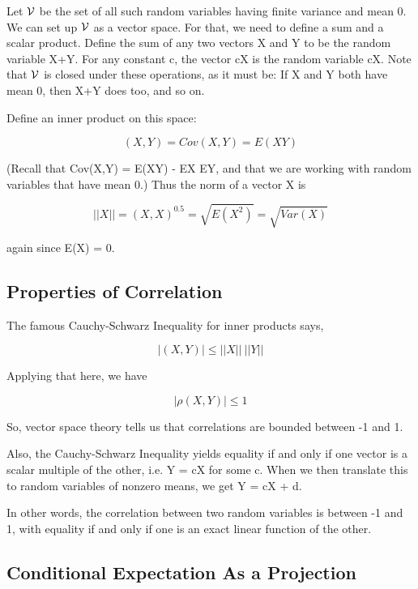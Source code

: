 \documentclass[11pt]{article}
\begin{document}
Let $\cal V$ be the set of all such random variables having finite
variance and mean 0.  We can set up $\cal V$ as a vector space.  For that,
we need to define a sum and a scalar product.  Define the sum of any two
vectors X and Y to be the random variable X+Y.  For any constant c, the
vector cX is the random variable cX.  Note that $\cal V$ is closed under
these operations, as it must be:  If X and Y both have mean 0, then X+Y
does too, and so on.

Define an inner product on this space:

\begin{equation}
(X,Y) = Cov(X,Y) = E(XY) 
\end{equation}

(Recall that Cov(X,Y) = E(XY) - EX EY, and that we are working with
random variables that have mean 0.) Thus the norm of a vector X is

\begin{equation}
||X|| = {(X,X)}^{0.5} = \sqrt{E(X^2)} = \sqrt{Var(X)}
\end{equation}

again since E(X) = 0.

\subsection{Properties of Correlation}
\label{propcorr}

The famous Cauchy-Schwarz Inequality for inner products says,

\begin{equation}
|(X,Y)| \leq ||X|| ~ ||Y||
\end{equation}

Applying that here, we have

\begin{equation}
|\rho(X,Y)| \leq 1
\end{equation}

So, vector space theory tells us that correlations are bounded between
-1 and 1.

Also, the Cauchy-Schwarz Inequality yields equality if and only if one
vector is a scalar multiple of the other, i.e. Y = cX for some c.
When we then translate this to random variables of nonzero means,
we get Y = cX + d.  

In other words, the correlation between two random variables is between
-1 and 1, with equality if and only if one is an exact linear function
of the other.

\subsection{Conditional Expectation As a Projection}
\label{elegant} 
\end{document}
